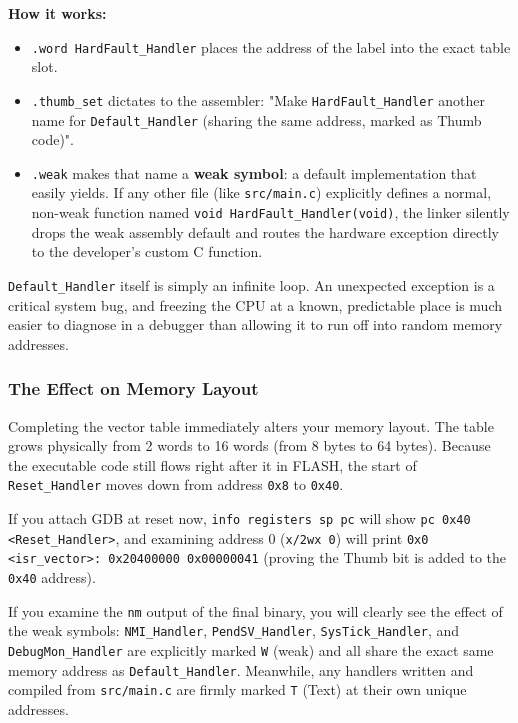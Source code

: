 \textbf{How it works:}
\begin{itemize}
    \item \texttt{.word HardFault\_Handler} places the address of the label into the exact table slot.
    \item \texttt{.thumb\_set} dictates to the assembler: "Make \texttt{HardFault\_Handler} another name for \texttt{Default\_Handler} (sharing the same address, marked as Thumb code)".
    \item \texttt{.weak} makes that name a \textbf{weak symbol}: a default implementation that easily yields. If any other file (like \texttt{src/main.c}) explicitly defines a normal, non-weak function named \texttt{void HardFault\_Handler(void)}, the linker silently drops the weak assembly default and routes the hardware exception directly to the developer's custom C function.
\end{itemize}

\texttt{Default\_Handler} itself is simply an infinite loop. An unexpected exception is a critical system bug, and freezing the CPU at a known, predictable place is much easier to diagnose in a debugger than allowing it to run off into random memory addresses.

\subsubsection{The Effect on Memory Layout}
Completing the vector table immediately alters your memory layout. The table grows physically from 2 words to 16 words (from 8 bytes to 64 bytes). Because the executable code still flows right after it in FLASH, the start of \texttt{Reset\_Handler} moves down from address \texttt{0x8} to \texttt{0x40}. 

If you attach GDB at reset now, \texttt{info registers sp pc} will show \texttt{pc 0x40 <Reset\_Handler>}, and examining address 0 (\texttt{x/2wx 0}) will print \texttt{0x0 <isr\_vector>: 0x20400000 0x00000041} (proving the Thumb bit is added to the \texttt{0x40} address). 

If you examine the \texttt{nm} output of the final binary, you will clearly see the effect of the weak symbols: \texttt{NMI\_Handler}, \texttt{PendSV\_Handler}, \texttt{SysTick\_Handler}, and \texttt{DebugMon\_Handler} are explicitly marked \texttt{W} (weak) and all share the exact same memory address as \texttt{Default\_Handler}. Meanwhile, any handlers written and compiled from \texttt{src/main.c} are firmly marked \texttt{T} (Text) at their own unique addresses.

